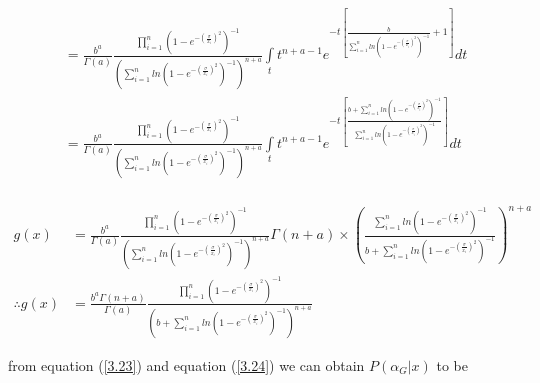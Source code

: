 \documentclass[a4paper,12pt]{report}
\begin{document}
{\[\begin{split}
&=\frac{b^a}{\Gamma(a)}\frac{\prod\limits_{ i=1 }^{n}\left(1-e^{-\left(\frac{\sigma}{x_i}\right)^2}\right)^{-1}}{\left(\sum\limits_{ i=1 }^{n}ln\left(1-e^{-\left(\frac{\sigma}{x_i}\right)^2}\right)^{-1}\right)^{n+a}}\int\limits_{t}t^{n+a-1}e^{-t\left[\frac{b}{\sum\limits_{ i=1 }^{n}ln\left(1-e^{-\left(\frac{\sigma}{x_i}\right)^2}\right)^{-1}}+1\right]}dt\\
&=\frac{b^a}{\Gamma(a)}\frac{\prod\limits_{ i=1 }^{n}\left(1-e^{-\left(\frac{\sigma}{x_i}\right)^2}\right)^{-1}}{\left(\sum\limits_{ i=1 }^{n}ln\left(1-e^{-\left(\frac{\sigma}{x_i}\right)^2}\right)^{-1}\right)^{n+a}}\int\limits_{t}t^{n+a-1}e^{-t\left[\frac{b+\sum\limits_{ i=1 }^{n}ln\left(1-e^{-\left(\frac{\sigma}{x_i}\right)^2}\right)^{-1}}{\sum\limits_{ i=1 }^{n}ln\left(1-e^{-\left(\frac{\sigma}{x_i}\right)^2}\right)^{-1}}\right]}dt\\
\end{split}\]

\begin{equation}\label{3.24}
\begin{split}
g(x)&=\frac{b^a}{\Gamma(a)}\frac{\prod\limits_{ i=1 }^{n}\left(1-e^{-\left(\frac{\sigma}{x_i}\right)^2}\right)^{-1}}{\left(\sum\limits_{ i=1 }^{n}ln\left(1-e^{-\left(\frac{\sigma}{x_i}\right)^2}\right)^{-1}\right)^{n+a}}\Gamma(n+a)\times\left(\frac{\sum\limits_{ i=1 }^{n}ln\left(1-e^{-\left(\frac{\sigma}{x_i}\right)^2}\right)^{-1}}{b+\sum\limits_{ i=1 }^{n}ln\left(1-e^{-\left(\frac{\sigma}{x_i}\right)^2}\right)^{-1}}\right)^{n+a}\\
\therefore g(x)&=\frac{b^a\Gamma(n+a)}{\Gamma(a)}\frac{\prod\limits_{ i=1 }^{n}\left(1-e^{-\left(\frac{\sigma}{x_i}\right)^2}\right)^{-1}}{\left(b+\sum\limits_{ i=1 }^{n}ln\left(1-e^{-\left(\frac{\sigma}{x_i}\right)^2}\right)^{-1}\right)^{n+a}}
\end{split}
\end{equation}
}
from equation (\ref{3.23}) and equation (\ref{3.24}) we can obtain $P(\alpha_G|x)$ to be
\end{document}
